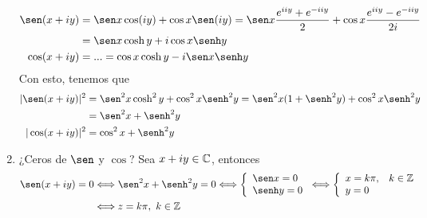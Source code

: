 \begin{enumerate}
\begin{align*}
              \sen(x+iy)   & = \sen x \cos(iy) + \cos x \sen(iy) = \sen x \frac{e^{iiy} + e^{-iiy}}{2} + \cos x\frac{e^{iiy}-e^{-iiy}}{2i} \\
                           & = \sen x \cosh y + i \cos x \senh y                                                                           \\
              \cos(x + iy) & = ... = \cos x \cosh y - i\sen x \senh y
          \end{align*}
          Con esto, tenemos que
          \begin{align*}
              |\sen(x+iy)|^2 & = \sen^2 x \cosh^2 y + \cos^2 x \senh^2 y = \sen^2 x (1 + \senh^2 y) + \cos^2 x \senh^2 y \\
                             & = \sen^2 x + \senh^2 y                                                                    \\
              |\cos(x+iy)|^2 & = \cos^2 x + \senh^2 y
          \end{align*}
    \item ¿Ceros de $\sen$ y $\cos$? Sea $x +iy \in \mathbb{C}$, entonces
          \begin{align*}
              \sen(x+iy) = 0   & \Longleftrightarrow \sen^2 x + \senh^2 y = 0 \Longleftrightarrow \left\{ \begin{array}{lcc}
                                                                                                              \sen x = 0  \\
                                                                                                              \senh y = 0 \\
                                                                                                          \end{array}
              \right. \Longleftrightarrow \left\{ \begin{array}{lcc}
                                                      x = k\pi, & k \in \mathbb{Z} \\
                                                      y = 0                        \\
                                                  \end{array}
              \right.                                                                                                       \\
                               & \Longleftrightarrow z = k\pi, \ k \in \mathbb{Z}                                           \\

\end{align*}
\end{enumerate}
